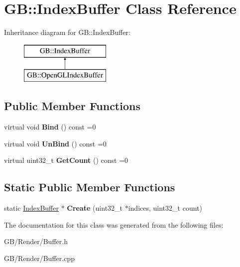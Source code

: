 \hypertarget{class_g_b_1_1_index_buffer}{}\section{GB\+::Index\+Buffer Class Reference}
\label{class_g_b_1_1_index_buffer}
Inheritance diagram for GB\+::Index\+Buffer\+:\begin{figure}[H]
\begin{center}
\leavevmode
\includegraphics[height=2.000000cm]{class_g_b_1_1_index_buffer}
\end{center}
\end{figure}
\subsection*{Public Member Functions}
\begin{DoxyCompactItemize}
\item 
\mbox{\label{class_g_b_1_1_index_buffer_ae38201a8845e9c08d61a8e7b9a7300fc}} 
virtual void {\bfseries Bind} () const =0
\item 
\mbox{\label{class_g_b_1_1_index_buffer_a72d54b41ee4f34c39215ec83bc684b0b}} 
virtual void {\bfseries Un\+Bind} () const =0
\item 
\mbox{\label{class_g_b_1_1_index_buffer_a7f8b515eeaaebd6d314e7a8d9451dfc4}} 
virtual uint32\+\_\+t {\bfseries Get\+Count} () const =0
\end{DoxyCompactItemize}
\subsection*{Static Public Member Functions}
\begin{DoxyCompactItemize}
\item 
\mbox{\label{class_g_b_1_1_index_buffer_a9ab6aa8ddfbe301bb01db50049a8a7c7}} 
static \mbox{\hyperlink{class_g_b_1_1_index_buffer}{Index\+Buffer}} $\ast$ {\bfseries Create} (uint32\+\_\+t $\ast$indices, uint32\+\_\+t count)
\end{DoxyCompactItemize}


The documentation for this class was generated from the following files\+:\begin{DoxyCompactItemize}
\item 
G\+B/\+Render/Buffer.\+h\item 
G\+B/\+Render/Buffer.\+cpp\end{DoxyCompactItemize}
